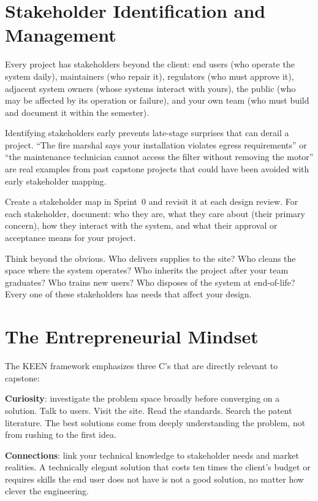 \section{Stakeholder Identification and Management}
Every project has stakeholders beyond the client: end users (who operate the system daily), maintainers (who repair it), regulators (who must approve it), adjacent system owners (whose systems interact with yours), the public (who may be affected by its operation or failure), and your own team (who must build and document it within the semester).

Identifying stakeholders early prevents late-stage surprises that can derail a project. ``The fire marshal says your installation violates egress requirements'' or ``the maintenance technician cannot access the filter without removing the motor'' are real examples from past capstone projects that could have been avoided with early stakeholder mapping.

Create a stakeholder map in Sprint~0 and revisit it at each design review. For each stakeholder, document: who they are, what they care about (their primary concern), how they interact with the system, and what their approval or acceptance means for your project.

\begin{tipbox}
Think beyond the obvious. Who delivers supplies to the site? Who cleans the space where the system operates? Who inherits the project after your team graduates? Who trains new users? Who disposes of the system at end-of-life? Every one of these stakeholders has needs that affect your design.
\end{tipbox}


\section{The Entrepreneurial Mindset}
The KEEN framework emphasizes three C's that are directly relevant to capstone:

\textbf{Curiosity}: investigate the problem space broadly before converging on a solution. Talk to users. Visit the site. Read the standards. Search the patent literature. The best solutions come from deeply understanding the problem, not from rushing to the first idea.

\textbf{Connections}: link your technical knowledge to stakeholder needs and market realities. A technically elegant solution that costs ten times the client's budget or requires skills the end user does not have is not a good solution, no matter how clever the engineering.

